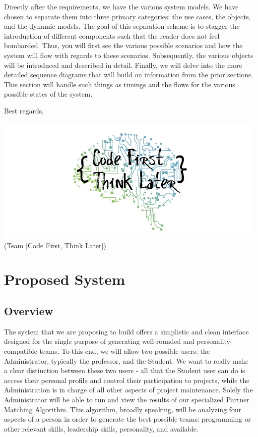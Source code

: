 \documentclass[12pt,letterpaper]{article}
\begin{document}
Directly after the requirements, we have the various system models. We have chosen to separate them into three
primary categories: the use cases, the objects, and the dynamic models. The goal of this separation scheme is to
stagger the introduction of different components such that the reader does not feel bombarded. Thus, you will 
first see the various possible scenarios and how the system will flow with regards to these scenarios. Subsequently, 
the various objects will be introduced and described in detail. Finally, we will delve into the more detailed sequence 
diagrams that will build on information from the prior sections. This section will handle such things as timings and
the flows for the various possible states of the system.

\vspace{1em}

\noindent Best regards,

\vspace{1em}

\begin{center}
	\includegraphics[scale=0.4]{imgs/logo.png} \\ \footnotesize{(Team [Code First, Think Later])}
\end{center}

\vspace{1em}

\section{Proposed System}

\subsection{Overview}

The system that we are proposing to build offers a simplistic and clean interface designed for the single purpose of generating 
well-rounded and personality-compatible teams. To this end, we will allow two possible users: the Administrator, typically the professor,
and the Student. We want to really make a clear distinction between these two users - all that the Student user can do is access their
personal profile and control their participation to projects, while the Administration is in charge of all other aspects of project maintenance. 
Solely the Administrator will be able to run and view the results of our specialized Partner Matching Algorithm. This algorithm, broadly speaking,
will be analyzing four aspects of a person in order to generate the best possible teams:  programming or other relevant skills, leadership skills,
personality, and available. 
\end{document}
